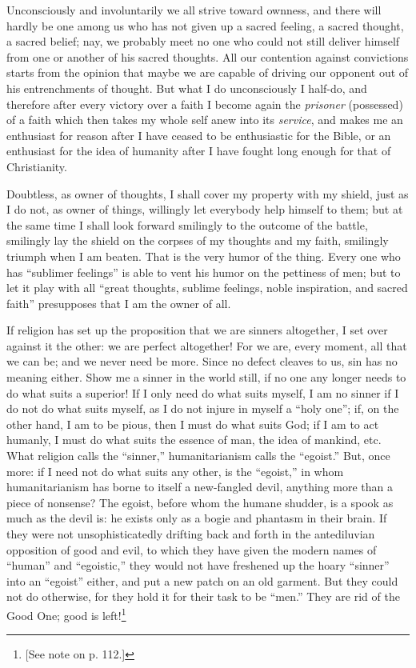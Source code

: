 Unconsciously and involuntarily we all strive toward ownness, and there will 
hardly be one among us who has not given up a sacred feeling, a sacred 
thought, a sacred belief; nay, we probably meet no one who could not still 
deliver himself from one or another of his sacred thoughts. All our contention 
against convictions starts from the opinion that maybe we are capable of 
driving our opponent out of his entrenchments of thought. But what I do 
unconsciously I half-do, and therefore after every victory over a faith I 
become again the \textit{prisoner} (possessed) of a faith which then takes my 
whole self anew into its \textit{service}, and makes me an enthusiast for 
reason after I have ceased to be enthusiastic for the Bible, or an enthusiast 
for the idea of humanity after I have fought long enough for that of 
Christianity.

Doubtless, as owner of thoughts, I shall cover my property with my shield, 
just as I do not, as owner of things, willingly let everybody help himself to 
them; but at the same time I shall look forward smilingly to the outcome of 
the battle, smilingly lay the shield on the corpses of my thoughts and my 
faith, smilingly triumph when I am beaten. That is the very humor of the 
thing. Every one who has ``sublimer feelings'' is able to vent his humor on 
the pettiness of men; but to let it play with all ``great thoughts, sublime 
feelings, noble inspiration, and sacred faith'' presupposes that I am the 
owner of all.

If religion has set up the proposition that we are sinners altogether, I set 
over against it the other: we are perfect altogether! For we are, every 
moment, all that we can be; and we never need be more. Since no defect cleaves 
to us, sin has no meaning either. Show me a sinner in the world still, if no 
one any longer needs to do what suits a superior! If I only need do what suits 
myself, I am no sinner if I do not do what suits myself, as I do not injure in 
myself a ``holy one''; if, on the other hand, I am to be pious, then I must 
do what suits God; if I am to act humanly, I must do what suits the essence of 
man, the idea of mankind, etc. What religion calls the ``sinner,'' 
humanitarianism calls the ``egoist.'' But, once more: if I need not do what 
suits any other, is the ``egoist,'' in whom humanitarianism has borne to 
itself a new-fangled devil, anything more than a piece of nonsense? The 
egoist, before whom the humane shudder, is a spook as much as the devil is: he 
exists only as a bogie and phantasm in their brain. If they were not 
unsophisticatedly drifting back and forth in the antediluvian opposition of 
good and evil, to which they have given the modern names of ``human'' and 
``egoistic,'' they would not have freshened up the hoary ``sinner'' into 
an ``egoist'' either, and put a new patch on an old garment. But they could 
not do otherwise, for they hold it for their task to be ``men.'' They are 
rid of the Good One; good is left!\footnote{[See note on p. 112.]}


